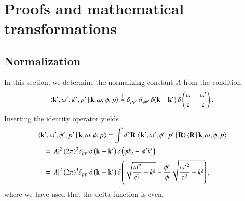 \chapter{Proofs and mathematical transformations}

\section{Normalization}

\label{appendix_normierung}

In this section, we determine the normalizing constant $A$ 
from the condition
\begin{equation}
\label{eq:appendix_norm1}
\braket{{\mathbf{k}}^\prime, \omega^\prime, \phi^\prime, p^\prime \, | \, {\mathbf{k}}, \omega, \phi, p} \stackrel{!}{=} \delta_{p p^\prime} \, \delta_{\phi \phi^\prime}\, \delta{\left({\mathbf{k}} - {\mathbf{k}}^\prime\right)} \, \delta\left(\frac{\omega}{\mathrm{c}}-\frac{\omega^\prime}{\mathrm{c}}\right).
\end{equation}
Inserting the identity operator yields
\begin{align}
\nonumber
&\braket{{\mathbf{k}}^\prime, \omega^\prime, \phi^\prime, p^\prime \, | \, {\mathbf{k}}, \omega, \phi, p} = \int d^3{\mathbf{R}} \, \braket{{\mathbf{k}}^\prime, \omega^\prime, \phi^\prime, p^\prime \, | \, {\mathbf{R}}} \braket{{\mathbf{R}} \, |\,  {\mathbf{k}}, \omega, \phi, p} \\
\nonumber
&\quad =\left|A\right|^2 (2\pi)^3 \delta_{p p^\prime} \delta\left({\mathbf{k}}- {\mathbf{k}}^\prime\right) \delta\left(\phi k_z- \phi^\prime k_z^\prime\right) \\
\label{eq:appendix_norm2}
&\quad =\left|A\right|^2 (2\pi)^3 \delta_{p p^\prime} \delta\left({\mathbf{k}} - {\mathbf{k}}^\prime\right) \delta\left(\sqrt{\frac{\omega^2}{\mathrm{c}^2}-k^2}-\frac{\phi^\prime}{\phi}\sqrt{\frac{{\omega^\prime}^2}{\mathrm{c}^2}-k^2}\right),
\end{align}
where we have used that the delta function is even.

